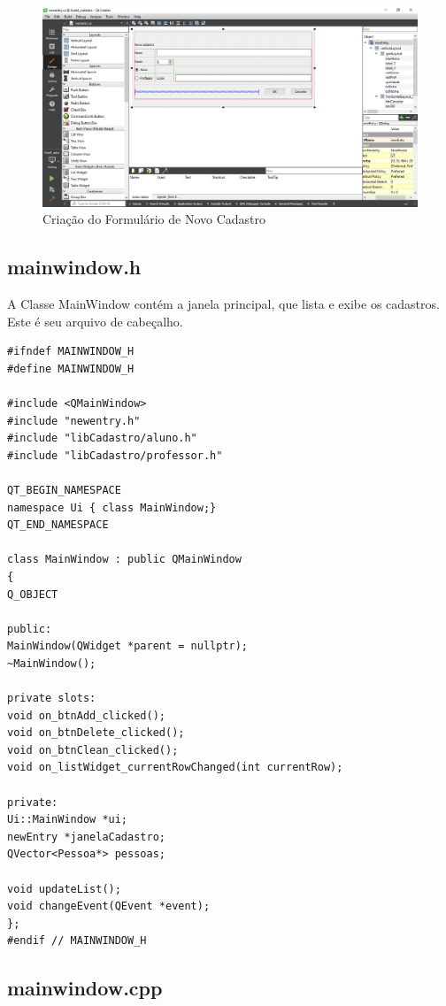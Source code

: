 \documentclass[12pt,a4paper]{article}
\begin{document}
\begin{figure}[H]
	\centering
	\includegraphics[width=\textwidth]{new_edit}
	\caption{Criação do Formulário de Novo Cadastro}
	\label{newform}
\end{figure}

\subsection*{mainwindow.h}

A Classe MainWindow contém a janela principal, que lista e exibe os cadastros.
Este é seu arquivo de cabeçalho.

\begin{verbatim}
#ifndef MAINWINDOW_H
#define MAINWINDOW_H

#include <QMainWindow>
#include "newentry.h"
#include "libCadastro/aluno.h"
#include "libCadastro/professor.h"

QT_BEGIN_NAMESPACE
namespace Ui { class MainWindow;}
QT_END_NAMESPACE

class MainWindow : public QMainWindow
{
Q_OBJECT

public:
MainWindow(QWidget *parent = nullptr);
~MainWindow();

private slots:
void on_btnAdd_clicked();
void on_btnDelete_clicked();
void on_btnClean_clicked();
void on_listWidget_currentRowChanged(int currentRow);

private:
Ui::MainWindow *ui;
newEntry *janelaCadastro;
QVector<Pessoa*> pessoas;

void updateList();
void changeEvent(QEvent *event);
};
#endif // MAINWINDOW_H
\end{verbatim}

\subsection*{mainwindow.cpp}
\end{document}
